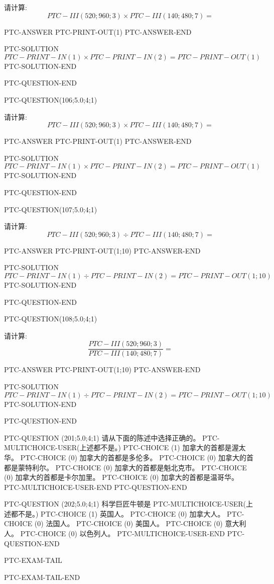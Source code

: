 \documentclass{ctexart}
\begin{document}
请计算: 
\begin{equation}
PTC-III (520; 960; 3)  \times   PTC-III (140; 480; 7) = \nonumber 
\end{equation}

PTC-ANSWER
   PTC-PRINT-OUT(1)
PTC-ANSWER-END

PTC-SOLUTION
$PTC-PRINT-IN(1) \times PTC-PRINT-IN(2)=  PTC-PRINT-OUT(1)$
PTC-SOLUTION-END

PTC-QUESTION-END




PTC-QUESTION(106;5.0;4;1)

请计算: 
\begin{equation}
PTC-III (520; 960; 3)  \times   PTC-III (140; 480; 7) = \nonumber 
\end{equation}

PTC-ANSWER
   PTC-PRINT-OUT(1)
PTC-ANSWER-END

PTC-SOLUTION
$PTC-PRINT-IN(1) \times PTC-PRINT-IN(2)=  PTC-PRINT-OUT(1)$
PTC-SOLUTION-END

PTC-QUESTION-END




PTC-QUESTION(107;5.0;4;1)

请计算: 
\begin{equation}
PTC-III (520; 960; 3)  \div   PTC-III (140; 480; 7) = \nonumber 
\end{equation}

PTC-ANSWER
   PTC-PRINT-OUT(1;10)
PTC-ANSWER-END

PTC-SOLUTION
$PTC-PRINT-IN(1) \div PTC-PRINT-IN(2)=  PTC-PRINT-OUT(1;10)$
PTC-SOLUTION-END

PTC-QUESTION-END




PTC-QUESTION(108;5.0;4;1)

请计算: 
\begin{equation}
\frac {PTC-III (520; 960; 3) }  { PTC-III (140; 480; 7)} = \nonumber 
\end{equation}

PTC-ANSWER
   PTC-PRINT-OUT(1;10)
PTC-ANSWER-END

PTC-SOLUTION
$PTC-PRINT-IN(1) \div PTC-PRINT-IN(2)=  PTC-PRINT-OUT(1;10)$
PTC-SOLUTION-END

PTC-QUESTION-END










PTC-QUESTION  (201;5.0;4;1)
请从下面的陈述中选择正确的。
PTC-MULTICHOICE-USER(上述都不是。)
   PTC-CHOICE (1) 加拿大的首都是渥太华。
   PTC-CHOICE (0) 加拿大的首都是多伦多。
   PTC-CHOICE (0) 加拿大的首都是蒙特利尔。
   PTC-CHOICE (0) 加拿大的首都是魁北克市。
   PTC-CHOICE (0) 加拿大的首都是卡尔加里。
   PTC-CHOICE (0) 加拿大的首都是温哥华。
PTC-MULTICHOICE-USER-END
PTC-QUESTION-END



PTC-QUESTION  (202;5.0;4;1)
科学巨匠牛顿是
PTC-MULTICHOICE-USER(上述都不是。)
   PTC-CHOICE (1) 英国人。
   PTC-CHOICE (0) 加拿大人。
   PTC-CHOICE (0) 法国人。
   PTC-CHOICE (0) 美国人。
   PTC-CHOICE (0) 意大利人。
   PTC-CHOICE (0) 以色列人。
PTC-MULTICHOICE-USER-END
PTC-QUESTION-END



PTC-EXAM-TAIL

PTC-EXAM-TAIL-END
\end{document}
